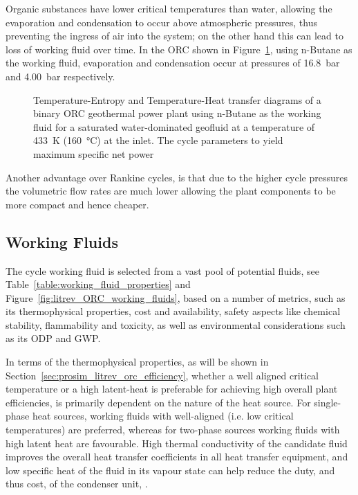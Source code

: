         Organic substances have lower critical temperatures than water, allowing the evaporation and condensation to occur above atmospheric pressures, thus preventing the ingress of air into the system; on the other hand this can lead to loss of working fluid over time. In the \ac{ORC} shown in Figure~\ref{fig:litrev_ORC_TS}, using n-Butane as the working fluid, evaporation and condensation occur at pressures of \qty{16.8}{\bar} and \qty{4.00}{\bar} respectively.

         \begin{figure}[H]
            \centering
            
            \caption[TS and TQ diagrams of a binary \ac{ORC} geothermal power plant using n-Butane as the working fluid.]{Temperature-Entropy and Temperature-Heat transfer diagrams of a binary \ac{ORC} geothermal power plant using n-Butane as the working fluid for a saturated water-dominated geofluid at a temperature of \qty{433}{\K} (\qty{160}{\degreeCelsius}) at the inlet. The cycle parameters to yield maximum specific net power}
            \label{fig:litrev_ORC_TS}
        \end{figure}

        Another advantage over Rankine cycles, is that due to the higher cycle pressures the volumetric flow rates are much lower allowing the plant components to be more compact and hence cheaper.

    \subsection{Working Fluids}
        The cycle working fluid is selected from a vast pool of potential fluids, see Table~\ref{table:working_fluid_properties} and Figure~\ref{fig:litrev_ORC_working_fluids}, based on a number of metrics, such as its thermophysical properties, cost and availability, safety aspects like chemical stability, flammability and toxicity, as well as environmental considerations such as its \ac{ODP} and \ac{GWP}.

        In terms of the thermophysical properties, as will be shown in Section~\ref{sec:prosim_litrev_orc_efficiency}, whether a well aligned critical temperature or a high latent-heat is preferable for achieving high overall plant efficiencies, is primarily dependent on the nature of the heat source. For single-phase heat sources, working fluids with well-aligned (i.e. low critical temperatures) are preferred, whereas for two-phase sources working fluids with high latent heat are favourable. High thermal conductivity of the candidate fluid improves the overall heat transfer coefficients in all heat transfer equipment, and low specific heat of the fluid in its vapour state can help reduce the duty, and thus cost, of the condenser unit, \cite{Hung2010}.

